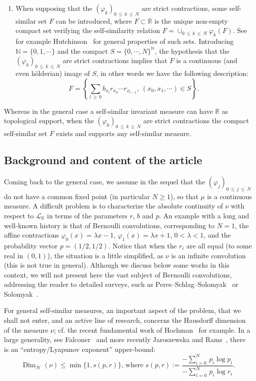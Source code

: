\documentclass[10pt]{amsart}
\theoremstyle{definition}\newtheorem{defi}[theo]{Definition}\newtheorem{rema}[theo]{Remark}\newtheorem{exam}[theo]{Example}\newtheorem{exem}[theo]{Example}\newtheorem{nota}[theo]{Notation}
\newcommand{\Rbb}{\mathbb R}
\newcommand{\Nbb}{\mathbb N}
\newcommand{\Lcl}{\mathcal{L}}
\newcommand{\Hcl}{\mathcal{H}}
\DeclareMathOperator{\Dim}{Dim}
\begin{document}
\begin{enumerate}
\item \label{first-iv}When supposing that the $(\varphi_k)_{0\,\leq\,k\,\leq\,N}$ are strict contractions, some self-similar set $F$ can be introduced, where $F\subset\Rbb$ is the unique non-empty compact set verifying the self-similarity relation $F=\cup_{0\,\leq\,k\,\leq\,N}\varphi_k(F)$. See for example Hutchinson~\cite{hut} for general properties of such sets. Introducing $\Nbb=\{0,1,\cdots\}$ and the compact $S=\{0,\cdots,N\}^{\Nbb}$, the hypothesis that the $(\varphi_k)_{0\,\leq\,k\,\leq\,N}$ are strict contractions implies that $F$ is a continuous (and even h\"olderian) image of $S$, in other words we have the following description:
\[
F=\left\{{\sum_{l\,\geq\,0}b_{x_l}r_{x_0}\cdots r_{x_{l-1}},\,(x_0,x_1,\cdots)\in S}\right\}.
\]
\end{enumerate}


Whereas in the general case a self-similar invariant measure can have $\Rbb$ as topological support, when the $(\varphi_k)_{0\,\leq\,k\,\leq\,N}$ are strict contractions the compact self-similar set $F$ exists and supports any self-similar measure.


\subsection*{Background and content of the article}
Coming back to the general case, we assume in the sequel that the $(\varphi_j)_{0\,\leq\,j\,\leq\,N}$ do not have a common fixed point (in particular $N\geq1$), so that $\mu$ is a continuous measure. A difficult problem is to characterize the absolute continuity of $\nu$ with respect to ${\Lcl}_{\Rbb}$ in terms of the parameters $r$, $b$ and $p$. An example with a long and well-known history is that of Bernoulli convolutions, corresponding to $N=1$, the affine contractions $\varphi_0(x)=\lambda x-1$, $\varphi_1(x)=\lambda x+1$, $0<\lambda<1$, and the probability vector $p=(1/2,1/2)$. Notice that when the $r_i$ are all equal (to some real in $(0,1)$), the situation is a little simplified, as $\nu$ is an infinite convolution (this is not true in general). Although we discuss below some works in this context, we will not present here the vast subject of Bernoulli convolutions, addressing the reader to detailed surveys, such as Peres--Schlag--Solomyak~\cite{sixty} or Solomyak~\cite{solo}.


For general self-similar measures, an important aspect of the problem, that we shall not enter, and an active line of research, concerns the Hausdorff dimension of the measure $\nu$; cf. the recent fundamental work of Hochman~\cite{hochman} for example. In a large generality, see Falconer~\cite{falco} and more recently Jaroszewska and Rams~\cite{rams}, there is an ``entropy/Lyapunov exponent'' upper-bound:
\[
\Dim_{{\Hcl}}(\nu)\leq\min\{1,s(p,r)\}\text{, where }s(p,r):=\frac{-\displaystyle{\sum_{i=0}^N}\,p_i\log p_i}{-\displaystyle{\sum_{i=0}^N}\,p_i\log r_i}.
\]
\end{document}
